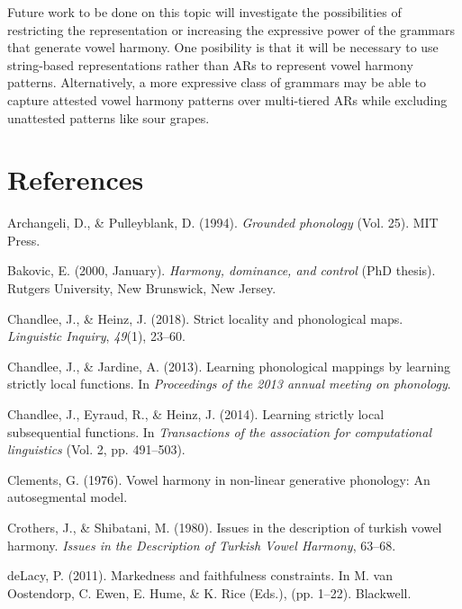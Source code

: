 \documentclass[,doc,floatsintext]{apa6}
\theoremstyle{definition}
\theoremstyle{definition}
\theoremstyle{definition}
\theoremstyle{remark}
\begin{document}
Future work to be done on this topic will investigate the possibilities
of restricting the representation or increasing the expressive power of
the grammars that generate vowel harmony. One posibility is that it will
be necessary to use string-based representations rather than ARs to
represent vowel harmony patterns. Alternatively, a more expressive class
of grammars may be able to capture attested vowel harmony patterns over
multi-tiered ARs while excluding unattested patterns like sour grapes.

\newpage

\section{References}\label{references}

\setlength{\parindent}{-0.5in} \setlength{\leftskip}{0.5in}

\hypertarget{refs}{}
\hypertarget{ref-archangelipulleyblank1994}{}
Archangeli, D., \& Pulleyblank, D. (1994). \emph{Grounded phonology}
(Vol. 25). MIT Press.

\hypertarget{ref-bakovic2000}{}
Bakovic, E. (2000, January). \emph{Harmony, dominance, and control}
(PhD thesis). Rutgers University, New Brunswick, New Jersey.

\hypertarget{ref-chandleeheinz2018}{}
Chandlee, J., \& Heinz, J. (2018). Strict locality and phonological
maps. \emph{Linguistic Inquiry}, \emph{49}(1), 23--60.

\hypertarget{ref-chandleejardine2013}{}
Chandlee, J., \& Jardine, A. (2013). Learning phonological mappings by
learning strictly local functions. In \emph{Proceedings of the 2013
annual meeting on phonology}.

\hypertarget{ref-chandleeeyraudheinz2014}{}
Chandlee, J., Eyraud, R., \& Heinz, J. (2014). Learning strictly local
subsequential functions. In \emph{Transactions of the association for
computational linguistics} (Vol. 2, pp. 491--503).

\hypertarget{ref-Clements1976}{}
Clements, G. (1976). Vowel harmony in non-linear generative phonology:
An autosegmental model.

\hypertarget{ref-crothersshibatani1980}{}
Crothers, J., \& Shibatani, M. (1980). Issues in the description of
turkish vowel harmony. \emph{Issues in the Description of Turkish Vowel
Harmony}, 63--68.

\hypertarget{ref-delacy2011}{}
deLacy, P. (2011). Markedness and faithfulness constraints. In M. van
Oostendorp, C. Ewen, E. Hume, \& K. Rice (Eds.), (pp. 1--22). Blackwell.
\end{document}
